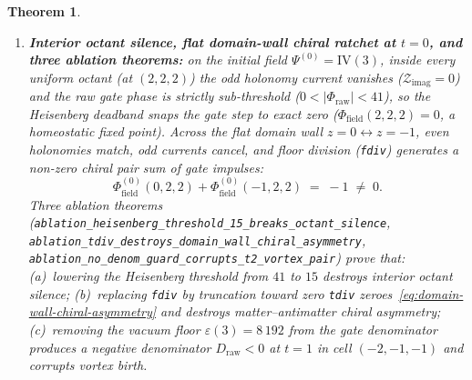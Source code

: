 \documentclass[11pt,a4paper]{article}
\theoremstyle{plain}
\newtheorem{theorem}{Theorem}[section]
\theoremstyle{definition}
\begin{document}
\begin{theorem}
\begin{enumerate}[label=\textbf{(\arabic*)},leftmargin=*]
\item \textbf{Interior octant silence, flat domain-wall chiral ratchet at $t = 0$, and three ablation theorems:}
  on the initial field $\Psi^{(0)} = \mathrm{IV}(3)$, inside every uniform octant (at $(2, 2, 2)$) the odd holonomy current vanishes ($\mathcal{Z}_{\mathrm{imag}} = 0$) and the raw gate phase is strictly sub-threshold ($0 < |\Phi_{\mathrm{raw}}| < 41$), so the Heisenberg deadband snaps the gate step to exact zero ($\Phi_{\mathrm{field}}(2,2,2) = 0$, a homeostatic fixed point). Across the flat domain wall $z = 0 \leftrightarrow z = -1$, even holonomies match, odd currents cancel, and floor division (\texttt{fdiv}) generates a non-zero chiral pair sum of gate impulses:
  \begin{equation}
    \label{eq:domain-wall-chiral-asymmetry}
    \Phi_{\mathrm{field}}^{(0)}(0, 2, 2) + \Phi_{\mathrm{field}}^{(0)}(-1, 2, 2) \;=\; -1 \;\ne\; 0.
  \end{equation}
  Three ablation theorems (\texttt{ablation\_heisenberg\_threshold\_15\_breaks\_octant\_silence}, \texttt{ablation\_tdiv\_destroys\_domain\_wall\_chiral\_asymmetry}, \texttt{ablation\_no\_denom\_guard\_corrupts\_t2\_vortex\_pair}) prove that: (a)~lowering the Heisenberg threshold from $41$ to $15$ destroys interior octant silence; (b)~replacing \texttt{fdiv} by truncation toward zero \texttt{tdiv} zeroes~\eqref{eq:domain-wall-chiral-asymmetry} and destroys matter--antimatter chiral asymmetry; (c)~removing the vacuum floor $\varepsilon(3) = 8\,192$ from the gate denominator produces a negative denominator $D_{\mathrm{raw}} < 0$ at $t = 1$ in cell $(-2, -1, -1)$ and corrupts vortex birth.


\end{enumerate}
\end{theorem}
\end{document}
